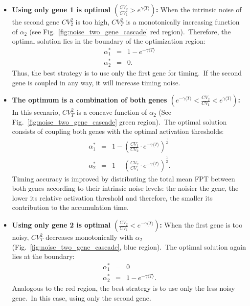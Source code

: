 \documentclass[aps,prb,reprint,superscriptaddress]{revtex4-2}
\begin{document}
\begin{itemize}
    \item \textbf{Using only gene 1 is optimal $\left(\frac{CV_2}{CV_1}>e^{\gamma\langle T\rangle}\right)$:} When the intrinsic noise of the second gene $CV^2_2$ is too high, $CV^2_T$ is a monotonically increasing function of $\alpha_2$ (see Fig.~\ref{fig:noise_two_gene_cascade} red region).~Therefore, the optimal solution lies in the boundary of the optimization region:
    \begin{subequations}\label{optimal_two_3}
\begin{eqnarray}
    \alpha_{1}^* &=& 1 - e^{-\gamma\langle T \rangle} \\ 
    \alpha_{2}^* &=& 0.
\end{eqnarray}
\end{subequations}
Thus, the best strategy is to use only the first gene for timing.~If the second gene is coupled in any way, it will increase timing noise.

    \item \textbf{The optimum is a combination of both genes $\left(e^{-\gamma\langle T\rangle} < \frac{CV_2}{CV_1} < e^{\gamma\langle T\rangle}\right)$:} In this scenario, $CV^2_T$ is a concave function of $\alpha_2$ (See Fig.~\ref{fig:noise_two_gene_cascade} green region).~The optimal solution consists of coupling both genes with the optimal activation thresholds:
\begin{subequations}\label{optimal_two_1}
\begin{eqnarray}
    \alpha_{1}^* &=& 1 - \left( \frac{CV_{1}}{CV_{2}} \cdot e^{-\gamma \langle T \rangle} \right)^{\frac{1}{2}} \\ 
    \alpha_{2}^* &=& 1 - \left( \frac{CV_{2}}{CV_{1}} \cdot e^{-\gamma \langle T \rangle} \right)^{\frac{1}{2}}.
\end{eqnarray}
\end{subequations}
Timing accuracy is improved by distributing the total mean FPT between both genes according to their intrinsic noise levels: the noisier the gene, the lower its relative activation threshold and therefore, the smaller its contribution to the accumulation time.

   \item \textbf{Using only gene 2 is optimal $\left( \frac{CV_2}{CV_1} < e^{-\gamma\langle T\rangle}\right)$:} When the first gene is too noisy, $CV_T^2$ decreases monotonically with $\alpha_2$ (Fig.~\ref{fig:noise_two_gene_cascade}, blue region).~The optimal solution again lies at the boundary:
        \begin{subequations}\label{optimal_two_2}
\begin{eqnarray}
    \alpha_{1}^* &=& 0 \\ 
    \alpha_{2}^* &=& 1 - e^{-\gamma\langle T \rangle}.
\end{eqnarray}
\end{subequations} Analogous to the red region, the best strategy is to use only the less noisy gene.~In this case, using only the second gene.
\end{itemize}
\end{document}
